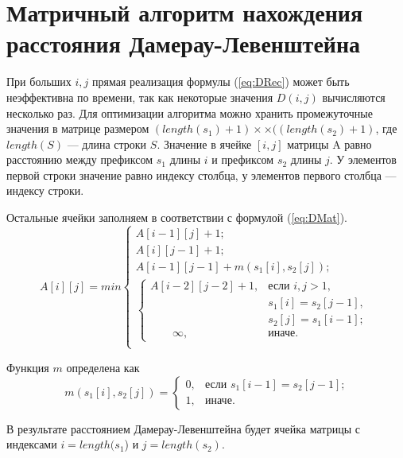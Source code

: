 \section{Матричный алгоритм нахождения \newline расстояния Дамерау-Левенштейна}

При больших $i, j$ прямая реализация формулы (\ref{eq:DRec}) может быть неэффективна по времени, так как некоторые значения $ D(i, j)$ вычисляются несколько раз. Для оптимизации алгоритма можно хранить промежуточные значения в матрице размером $(length(s_{1})+ 1) \times \times((length(s_{2}) + 1)$, где $length(S)$ --- длина строки $S$. Значение в ячейке $[i, j]$ матрицы A равно расстоянию между префиксом $s_{1}$ длины $i$ и префиксом $s_{2}$ длины $j$. У элементов первой строки значение равно индексу столбца, у элементов первого столбца --- индексу строки.

Остальные ячейки заполняем в соответствии с формулой (\ref{eq:DMat}).
\begin{equation}
	\label{eq:DMat}
	A[i][j] = min \begin{cases}
		A[i-1][j] + 1;\\
		A[i][j-1] + 1;\\
		A[i-1][j-1] + m(s_{1}[i], s_{2}[j]);\\
		\begin{cases} 
			A[i-2][j-2] + 1, &\text{если }i,j > 1,\\
			\qquad &s_{1}[i] = s_{2}[j-1],\\
			\qquad &s_{2}[j] = s_{1}[i-1];\\
			\qquad \infty, & \text{иначе.}
		\end{cases}\\
	\end{cases}
\end{equation}

Функция $m$ определена как
\begin{equation}
	\label{eq:m2}
	m(s_{1}[i], s_{2}[j]) = \begin{cases}
		0, &\text{если $s_{1}[i - 1] = s_{2}[j - 1]$;}\\
		1, &\text{иначе.}
	\end{cases}
\end{equation}

В результате расстоянием Дамерау-Левенштейна будет ячейка матрицы с индексами $i = length(s_{1}$) и $j = length(s_{2})$.




